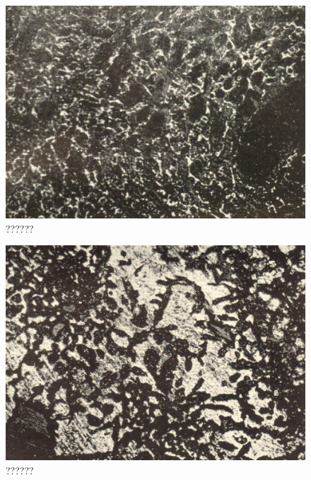 \begin{figure}[H]
\renewcommand{\thefigure}{24A}
\includegraphics[scale=1]{images/chapter-4/fig024A.jpg}
\caption{??????}\label{chapter-4-fig24A}
\end{figure}

\begin{figure}[H]
\renewcommand{\thefigure}{24B}
\includegraphics[scale=1]{images/chapter-4/fig024B.jpg}
\caption{??????}\label{chapter-4-fig24B}
\end{figure}

\newpage

